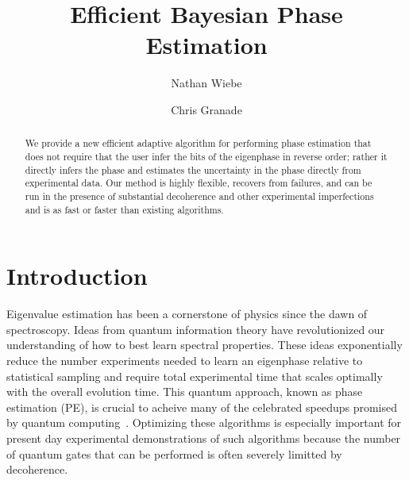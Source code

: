 \documentclass[aps,pra,amsmath,twocolumn,amssymb,superscriptaddress]{revtex4-1}
\begin{document}

\title{Efficient Bayesian Phase Estimation}
\author{Nathan Wiebe}

\author{Chris Granade}

\begin{abstract}
    We provide a new efficient adaptive algorithm for performing phase
    estimation that does not require that the user infer the bits of the
    eigenphase in reverse order; rather it directly infers the phase and
    estimates the uncertainty in the phase directly from experimental data. Our
    method is highly flexible, recovers from failures, and can be run in the
    presence of substantial decoherence and other experimental imperfections
    and is as fast or faster than existing algorithms.
\end{abstract}

\maketitle

\section{Introduction}
\label{sec:intro}


Eigenvalue estimation has been a cornerstone of physics since the dawn of spectroscopy.  Ideas from quantum information theory have revolutionized our understanding of how to best learn spectral properties.  These ideas exponentially reduce the number experiments needed to learn an eigenphase relative to statistical sampling and require total experimental time that scales optimally with the overall evolution time.  This quantum approach, known as phase estimation (PE), is crucial to acheive many of the celebrated speedups promised by quantum computing~\cite{shor_polynomial-time_1995,BHM+02,ADL+05,harrow2009quantum,lanyon2010towards}.  Optimizing these algorithms is especially important for present day experimental demonstrations of such algorithms because the number of quantum gates that can be performed is often severely limitted by decoherence.
\end{document}
